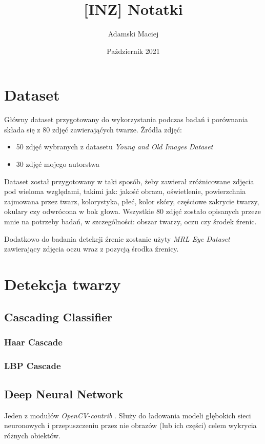 \documentclass[10pt, a4paper]{article}
\title{[INZ] Notatki}
\author{Adamski Maciej}
\date{Październik 2021}
\begin{document}
\maketitle

\section{Dataset}
\label{section:dataset}
Główny dataset przygotowany do wykorzystania podczas badań i porównania składa się z 80 zdjęć zawierająćych twarze. Źródła zdjęć:

\begin{itemize}
    \item 50 zdjęć wybranych z datasetu \textit{Young and Old Images Dataset} \cite{young_old_dataset}
    \item 30 zdjęć mojego autorstwa
\end{itemize}

Dataset został przygotowany w taki sposób, żeby zawierał zróżnicowane zdjęcia pod wieloma względami, takimi jak: jakość obrazu, oświetlenie, powierzchnia zajmowana przez twarz, kolorystyka, płeć, kolor skóry, częściowe zakrycie twarzy, okulary czy odwrócona w bok głowa. 
Wszystkie 80 zdjęć zostało opisanych przeze mnie na potrzeby badań, w szczególności: obszar twarzy, oczu czy środek źrenic. 
\par
Dodatkowo do badania detekcji źrenic zostanie użyty \textit{MRL Eye Dataset} \cite{mrl_eye_dataset} zawierający zdjęcia oczu wraz z pozycją środka źrenicy.

\section{Detekcja twarzy}

\subsection{Cascading Classifier}

\subsubsection{Haar Cascade}

\subsubsection{LBP Cascade}




\subsection{Deep Neural Network}
Jeden z modułów \textit{OpenCV-contrib} \cite{opencv_contirb}. Służy do ładowania modeli głębokich sieci neuronowych i przepuszczeniu przez nie obrazów (lub ich części) celem wykrycia różnych obiektów.
\end{document}
